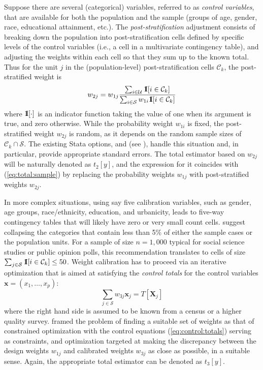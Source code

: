 Suppose there are several (categorical) variables, referred to
as {\it control variables}, that are available for both
the population and the sample
(groups of age, gender, race, educational attainment, etc.).
The {\it post-stratification} adjustment consists of breaking down
the population into post-stratification cells defined
by specific levels of the control variables (i.e., a cell in a multivariate
contingency table), and adjusting the weights within each cell
so that they sum up to the known total.
Thus for the unit $j$ in the (population-level) post-stratification 
cells $\mathcal{C}_k$, the post-stratified weight is
\begin{equation}
   w_{2j} = w_{1j} \frac%
        {\sum_{i \in \mathcal{U}} \One[i \in \mathcal{C}_k]}%
        {\sum_{i \in \mathcal{S}} w_{1i} \One[i \in \mathcal{C}_k]}%
   \label{eq:ps:weight}
\end{equation}
where ${\rm 1\kern-.3em I}[\cdot]$ is an indicator function taking the value of one
when its argument is true, and zero otherwise.
While the probability weight $w_{1i}$ is fixed, the post-stratified weight
$w_{2j}$ is random, as it depends on the random sample sizes of
$\mathcal{C}_k \cap \mathcal{S}$.
The existing Stata  options,  and 
(see ), handle this situation and,
in particular, provide appropriate standard errors. The total estimator
based on $w_{2j}$ will be naturally denoted as $t_2[y]$, and the expression
for it coincides with (\ref{eq:total:sample}) by replacing the probability
weights $w_{1j}$ with post-stratified weights $w_{2j}$.

In more complex situations, using say five calibration variables,
such as gender, age groups, race/ethnicity, education, and urbanicity,
leads to five-way contingency tables that will likely have zero or
very small count cells. \citet{batt:izra:hoag:fran:2009} suggest
collapsing the categories that contain less than 5\% of either
the sample cases or the population units. For a sample of size
$n=1,000$ typical for social science studies or public opinion polls,
this recommendation translates to cells of size
$\sum_{j \in \mathcal{S}} {\rm 1\kern-.3em I}[i \in \mathcal{C}_k] \le 50$.
Weight calibration has to proceed
via an iterative optimization that is aimed at satisfying
the {\it control totals} for the control variables $\mathbf{x}=(x_1, \ldots, x_p)$:
\begin{equation}
    \sum_{j \in \mathcal{S}} w_{3j} \mathbf{x}_j
    = T [ \mathbf{X}_j  ]
    \label{eq:control:totals}
\end{equation}
where the right hand side is assumed to be known from a census or
a higher quality survey.
\citet{deville:sarndal:1992} framed the problem of finding a suitable
set of weights as that of constrained optimization with the control
equations (\ref{eq:control:totals}) serving as constraints,
and optimization targeted at making the discrepancy between
the design weights $w_{1j}$ and calibrated weights
$w_{3j}$ as close as possible, in a suitable sense. Again,
the appropriate total estimator can be denoted as $t_3[y]$.


